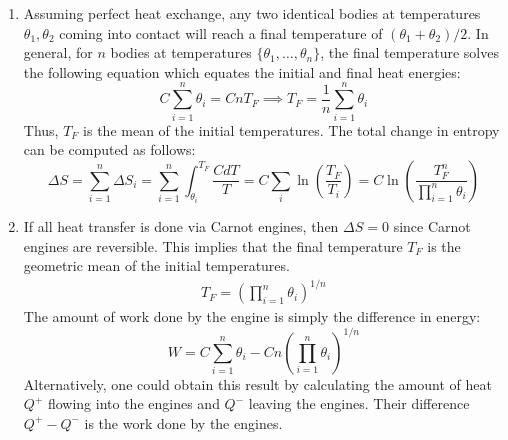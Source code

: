 \documentclass{article}
\theoremstyle{definition}
\newcommand{\f}[2]{\frac{#1}{#2}}
\newcommand{\lp}{\left(}
\newcommand{\rp}{\right)}
\begin{document}
\begin{enumerate}[label=(\alph*)]
	\item Assuming perfect heat exchange, any two identical bodies at temperatures $\theta_1,\theta_2$ coming into contact will reach a final temperature of $(\theta_1+\theta_2)/2$. In general, for $n$ bodies at temperatures $\{\theta_1,\dots,\theta_n\}$, the final temperature solves the following equation which equates the initial and final heat energies:
	\begin{equation*}
	C\sum_{i=1}^n \theta_i = CnT_F \implies \boxed{T_F = \f{1}{n}\sum_{i=1}^n \theta_i}
	\end{equation*}
	Thus, $T_F$ is the mean of the initial temperatures. The total change in entropy can be computed as follows:
	\begin{equation*}
	\Delta S = \sum_{i=1}^n \Delta S_i = \sum_{i=1}^n \int^{T_F}_{\theta_i} \f{CdT}{T} = C\sum_i \ln \lp \f{T_F}{T_i} \rp = \boxed{C\ln \lp \f{T_F^n}{\prod_{i=1}^n \theta_i} \rp}
	\end{equation*}
	
	
	
	\item If all heat transfer is done via Carnot engines, then $\Delta S = 0$ since Carnot engines are reversible. This implies that the final temperature $T_F$ is the geometric mean of the initial temperatures.
	\begin{align*}
	\boxed{T_F = \lp \prod_{i=1}^n \theta_i \rp^{1/n} }
	\end{align*}
	The amount of work done by the engine is simply the difference in energy:
	\begin{equation*}
	\boxed{W = C\sum^n_{i=1}\theta_i - Cn\lp \prod_{i=1}^n \theta_i \rp^{1/n}  }
	\end{equation*}
	Alternatively, one could obtain this result by calculating the amount of heat $Q^+$ flowing into the engines and $Q^-$ leaving the engines. Their difference $Q^+ - Q^-$ is the work done by the engines.   
	

\end{enumerate}
\end{document}
